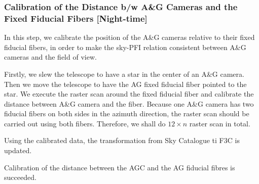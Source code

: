 \subsubsection{Calibration of the Distance b/w A\&G Cameras and the Fixed Fiducial Fibers [Night-time]}\label{secflow:agc2fff}

In this step, we calibrate the position of the A\&G cameras relative to their fixed fiducial fibers, in order to make the sky-PFI relation  consistent between A\&G cameras and the field of view.

Firstly, we slew the telescope to have a star in the center of an A\&G camera.
Then we move the telescope to have the AG fixed fiducial fiber pointed to the star.
We execute the raster scan around the fixed fiducial fiber and calibrate the distance between A\&G camera and the fiber.
Because one A\&G camera has two fiducial fibers on both sides in the azimuth direction, the raster scan should be carried out using both fibers.
Therefore, we shall do $12 \times n$ raster scan in total.

Using the calibrated data, the transformation from Sky Catalogue ti F3C is updated.

\begin{itembox}[l]{}
Calibration of the distance between the AGC and the AG fiducial fibres is succeeded.
\end{itembox}